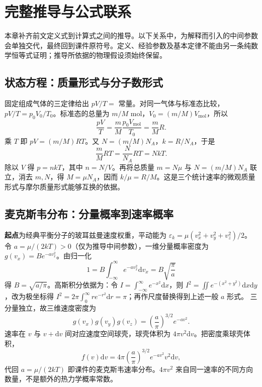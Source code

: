 \documentclass[UTF8,fontset=none,zihao=-4,a4paper]{ctexart}
\newcommand{\chapterpage}[1]{\clearpage\section{#1}}
\newcommand{\term}[1]{\textbf{#1}}
\begin{document}
\chapterpage{完整推导与公式联系}

本章补齐前文定义式到计算式之间的推导。以下关系中，为解释而引入的中间参数会单独交代，最终回到课件原符号。定义、经验参数及基本定律不能由另一条纯数学恒等式证明；推导所依据的物理假设须始终保留。
\subsection{状态方程：质量形式与分子数形式}
固定组成气体的三定律给出 $pV/T=$ 常量。对同一气体与标准态比较，$pV/T=p_0V_0/T_0$。标准态的总量为 $m/M$ mol，$V_0=(m/M)V_{\mathrm{mol}}$，所以
\[
\frac{pV}{T}=\frac mM\frac{p_0V_{\mathrm{mol}}}{T_0}=\frac mM R.
\]
乘 $T$ 即 $pV=(m/M)RT$。又 $N=(m/M)N_A$，$k=R/N_A$，于是
\[
\frac mM RT=\frac N{N_A}RT=NkT.
\]
除以 $V$ 得 $p=nkT$，其中 $n=N/V$。再将总质量 $m=N\mu$ 与 $N=(m/M)N_A$ 联立，消去 $m,N$，得 $M=\mu N_A$，因而 $k/\mu=R/M$。这是三个统计速率的微观质量形式与摩尔质量形式能够互换的依据。

\subsection{麦克斯韦分布：分量概率到速率概率}
\term{起点}为经典平衡分子的玻耳兹曼速度权重，平动能为 $\varepsilon_k=\mu(v_x^2+v_y^2+v_z^2)/2$。令 $a=\mu/(2kT)>0$（仅为推导中间参数），一维分量概率密度为 $g(v_x)=B e^{-av_x^2}$。由归一化
\[
1=B\int_{-\infty}^{\infty}e^{-av_x^2}\mathrm dv_x=B\sqrt{\frac\pi a}
\]
得 $B=\sqrt{a/\pi}$。高斯积分依据为：令 $I=\int_{-\infty}^{\infty}e^{-x^2}\mathrm dx$，则 $I^2=\iint e^{-(x^2+y^2)}\mathrm dx\mathrm dy$，改为极坐标得 $I^2=2\pi\int_0^\infty re^{-r^2}\mathrm dr=\pi$；再作尺度替换得到上述一般 $a$ 形式。
三分量独立，故三维速度密度为
\[
g(v_x)g(v_y)g(v_z)=\left(\frac a\pi\right)^{3/2}e^{-av^2}.
\]
速率在 $v$ 与 $v+\mathrm dv$ 间对应速度空间球壳，球壳体积为 $4\pi v^2\mathrm dv$。把密度乘球壳体积，
\[
f(v)\mathrm dv=4\pi\left(\frac a\pi\right)^{3/2}e^{-av^2}v^2\mathrm dv,
\]
代回 $a=\mu/(2kT)$ 即课件的麦克斯韦速率分布。$4\pi v^2$ 来自同一速率的不同方向数量，不是额外的热力学概率常数。
\end{document}
